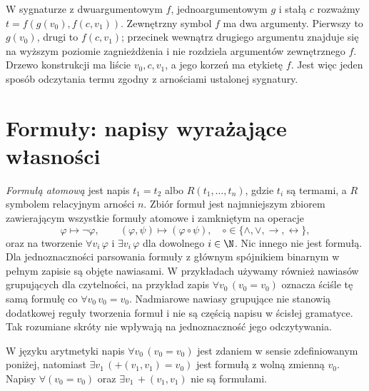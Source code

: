 \begin{przyklad}
W sygnaturze z dwuargumentowym $f$, jednoargumentowym $g$
i stałą $c$ rozważmy $t=f(g(v_0),f(c,v_1))$.
Zewnętrzny symbol $f$ ma dwa argumenty. Pierwszy to
$g(v_0)$, drugi to $f(c,v_1)$; przecinek wewnątrz
drugiego argumentu znajduje się na wyższym poziomie
zagnieżdżenia i nie rozdziela argumentów zewnętrznego $f$.
Drzewo konstrukcji ma liście $v_0,c,v_1$, a jego korzeń
ma etykietę $f$. Jest więc jeden sposób odczytania termu
zgodny z arnościami ustalonej sygnatury.
\end{przyklad}

\section{Formuły: napisy wyrażające własności}
\begin{definicja}\label{def:syntax-formula}
\emph{Formułą atomową} jest napis $t_1=t_2$ albo $R(t_1,\ldots,t_n)$,
gdzie $t_i$ są termami, a $R$ symbolem relacyjnym arności $n$.
Zbiór formuł jest najmniejszym zbiorem zawierającym wszystkie formuły atomowe
i zamkniętym na operacje
\[
\varphi\longmapsto\neg\varphi,
\qquad
(\varphi,\psi)\longmapsto
(\varphi\circ\psi),\quad
\circ\in\{\land,\lor,\to,\leftrightarrow\},
\]
oraz na tworzenie $\forall v_i\,\varphi$ i $\exists v_i\,\varphi$
dla dowolnego $i\in\N$. Nic innego nie jest formułą.
Dla jednoznaczności parsowania formuły z głównym spójnikiem binarnym
w pełnym zapisie są objęte nawiasami. W przykładach używamy również
nawiasów grupujących dla czytelności, na przykład zapis
$\forall v_0\,(v_0=v_0)$ oznacza ściśle tę samą formułę
co $\forall v_0\,v_0=v_0$. Nadmiarowe nawiasy grupujące
nie stanowią dodatkowej reguły tworzenia formuł i nie są
częścią napisu w ścisłej gramatyce. Tak rozumiane skróty
nie wpływają na jednoznaczność jego odczytywania.
\end{definicja}
\begin{przyklad}
W języku arytmetyki napis $\forall v_0\,(v_0=v_0)$ jest zdaniem
w sensie zdefiniowanym poniżej, natomiast
$\exists v_1\,(+(v_1,v_1)=v_0)$ jest formułą z wolną zmienną $v_0$.
Napisy $\forall(v_0=v_0)$ oraz $\exists v_1\,+(v_1,v_1)$ nie są formułami.
\end{przyklad}

